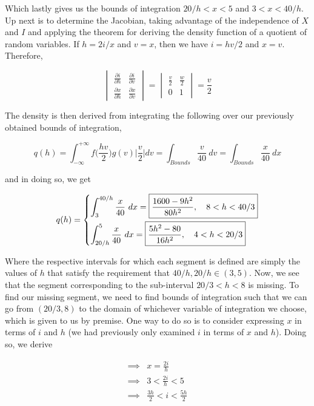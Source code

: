 \documentclass[10pt, oneside]{article}   	%
\theoremstyle{definition}
\begin{document}
\begin{enumerate}[label=6.\arabic*]
Which lastly gives us the bounds of integration $20/h < x < 5$ and $3 < x < 40/h$. Up next is to determine the Jacobian, taking advantage of the independence of $X$ and $I$ and applying the theorem for deriving the density function of a quotient of random variables. If $h = 2i/x$ and $v = x$, then we have $i = hv/2$ and $x = v$. Therefore,

\begingroup
\renewcommand*{\arraystretch}{3.5}
\[ \begin{vmatrix}
\frac{\partial i}{\partial h} & \frac{\partial i}{\partial v} \\
\frac{\partial x}{\partial h} & \frac{\partial x}{\partial v}
\end{vmatrix} = \begin{vmatrix}
\frac{v}{2} & \frac{w}{2} \\
0 & 1
\end{vmatrix}
 = \frac{v}{2} \]
 \endgroup

The density is then derived from integrating the following over our previously obtained bounds of integration,

\[ q(h) = \int^{+\infty}_{-\infty} f \Big( \frac{hv}{2} \Big) g(v) \Big| \frac{v}{2} \Big| dv = \int_{Bounds} \frac{v}{40} \ dv = \int_{Bounds} \frac{x}{40} \ dx \]

and in doing so, we get

\[ q(h) =
\begin{dcases}
\int^{40/h}_3 \frac{x}{40} \ dx = \boxed{ \frac{1600-9h^2}{80h^2}, \quad 8 < h < 40/3 } \\
\int^5_{20/h} \frac{x}{40} \ dx = \boxed{ \frac{5h^2 - 80}{16 h^2}, \quad 4 < h < 20/3 }
\end{dcases}
\]

Where the respective intervals for which each segment is defined are simply the values of $h$ that satisfy the requirement that $40/h, 20/h \in (3,5)$. Now, we see that the segment corresponding to the sub-interval $20/3 < h < 8$ is missing. To find our missing segment, we need to find bounds of integration such that we can go from $(20/3, 8)$ to the domain of whichever variable of integration we choose, which is given to us by premise. One way to do so is to consider expressing $x$ in terms of $i$ and $h$ (we had previously only examined $i$ in terms of $x$ and $h$). Doing so, we derive

\begin{align*}
\implies& x = \frac{2i}{h} \\
\implies& 3 < \frac{2i}{h} < 5 \\
\implies& \frac{3h}{2} < i < \frac{5h}{2}
\end{align*}


\end{enumerate}
\end{document}
